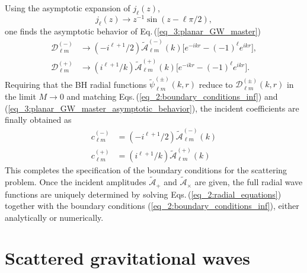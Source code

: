 \documentclass[reprint,amsmath,amssymb,aps,prd]{revtex4-2}
\begin{document}
Using the asymptotic expansion of $j_{\ell}(z)$,
\begin{equation}
j_{\ell}(z)\rightarrow z^{-1}\sin(z-\ell\pi/2),
\end{equation}
one finds the asymptotic behavior of Eq.\,(\ref{eq_3:planar_GW_master})
\begin{subequations}
\label{eq_3:planar_GW_master_asymptotic_behavior}
\begin{align}
\mathscr{D}^{(-)}_{\ell m}
&\rightarrow(-i^{\ell+1}/{2})\tilde{\mathcal{A}}_{\ell m}^{(-)}(k)
\Big[e^{-ikr}-(-1)^{\ell}e^{ikr}\Big],\\
\mathscr{D}_{\ell m}^{(+)}
&\rightarrow(i^{\ell+1}/k)\tilde{\mathcal{A}}^{(+)}_{\ell m}(k)
\Big[e^{-ikr}-(-1)^{\ell}e^{ikr}\Big].
\end{align}
\end{subequations}
Requiring that the BH radial functions $\tilde{\psi}_{\ell m}^{(\pm)}(k,r)$ reduce to $\mathscr{D}_{\ell m}^{(\pm)}(k,r)$ in the limit $M\to0$ and matching Eqs.\,(\ref{eq_2:boundary_conditions_inf}) and (\ref{eq_3:planar_GW_master_asymptotic_behavior}), the incident coefficients are finally obtained as 
\begin{subequations}
\label{eq_3:boundary_conditions}
\begin{align}
c_{\ell m}^{(-)}&=(-i^{\ell+1}/2)
\tilde{\mathcal{A}}^{(-)}_{\ell m}(k)\\
c_{\ell m}^{(+)}&=(i^{\ell+1}/k)\tilde{\mathcal{A}}^{(+)}_{\ell m}(k)
\end{align}
\end{subequations}
This completes the specification of the boundary conditions for the scattering problem. Once the incident amplitudes $\tilde{\mathcal{A}}_{+}$ and $\tilde{\mathcal{A}}_{\times}$ are given, the full radial wave functions are uniquely determined by solving Eqs.\,(\ref{eq_2:radial_equations}) together with the boundary conditions (\ref{eq_2:boundary_conditions_inf}), either analytically or numerically.

\vspace{1cm}

\section{\label{sec:scattered_GW}Scattered gravitational waves}
\end{document}
